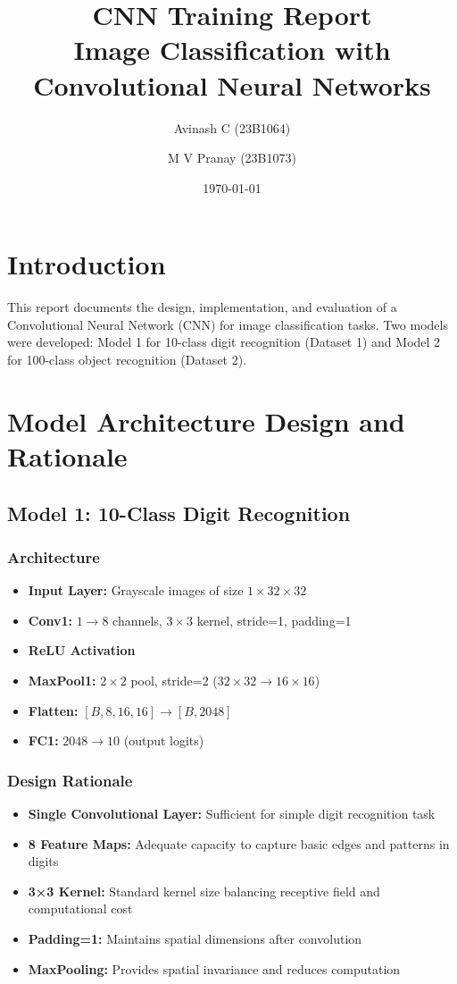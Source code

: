 \documentclass[11pt,a4paper]{article}
\title{\textbf{CNN Training Report} \\ 
Image Classification with Convolutional Neural Networks}
\author{Avinash C (23B1064) \and M V Pranay (23B1073)}
\date{\today}
\begin{document}
\maketitle

\section{Introduction}
This report documents the design, implementation, and evaluation of a Convolutional Neural Network (CNN) for image classification tasks. Two models were developed: Model 1 for 10-class digit recognition (Dataset 1) and Model 2 for 100-class object recognition (Dataset 2).

\section{Model Architecture Design and Rationale}

\subsection{Model 1: 10-Class Digit Recognition}

\subsubsection{Architecture}
\begin{itemize}
    \item \textbf{Input Layer:} Grayscale images of size $1 \times 32 \times 32$
    \item \textbf{Conv1:} $1 \rightarrow 8$ channels, $3 \times 3$ kernel, stride=1, padding=1
    \item \textbf{ReLU Activation}
    \item \textbf{MaxPool1:} $2 \times 2$ pool, stride=2 ($32 \times 32 \rightarrow 16 \times 16$)
    \item \textbf{Flatten:} $[B, 8, 16, 16] \rightarrow [B, 2048]$
    \item \textbf{FC1:} $2048 \rightarrow 10$ (output logits)
\end{itemize}

\subsubsection{Design Rationale}
\begin{itemize}
    \item \textbf{Single Convolutional Layer:} Sufficient for simple digit recognition task
    \item \textbf{8 Feature Maps:} Adequate capacity to capture basic edges and patterns in digits
    \item \textbf{3×3 Kernel:} Standard kernel size balancing receptive field and computational cost
    \item \textbf{Padding=1:} Maintains spatial dimensions after convolution
    \item \textbf{MaxPooling:} Provides spatial invariance and reduces computation
\end{itemize}
\end{document}
